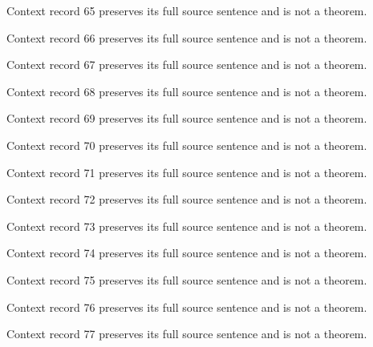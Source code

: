 \documentclass{article}
\begin{document}
\begin{remark}\label{train:context:65}Context record 65 preserves its full source sentence and is not a theorem.\end{remark}
\begin{remark}\label{train:context:66}Context record 66 preserves its full source sentence and is not a theorem.\end{remark}
\begin{remark}\label{train:context:67}Context record 67 preserves its full source sentence and is not a theorem.\end{remark}
\begin{remark}\label{train:context:68}Context record 68 preserves its full source sentence and is not a theorem.\end{remark}
\begin{remark}\label{train:context:69}Context record 69 preserves its full source sentence and is not a theorem.\end{remark}
\begin{remark}\label{train:context:70}Context record 70 preserves its full source sentence and is not a theorem.\end{remark}
\begin{remark}\label{train:context:71}Context record 71 preserves its full source sentence and is not a theorem.\end{remark}
\begin{remark}\label{train:context:72}Context record 72 preserves its full source sentence and is not a theorem.\end{remark}
\begin{remark}\label{train:context:73}Context record 73 preserves its full source sentence and is not a theorem.\end{remark}
\begin{remark}\label{train:context:74}Context record 74 preserves its full source sentence and is not a theorem.\end{remark}
\begin{remark}\label{train:context:75}Context record 75 preserves its full source sentence and is not a theorem.\end{remark}
\begin{remark}\label{train:context:76}Context record 76 preserves its full source sentence and is not a theorem.\end{remark}
\begin{remark}\label{train:context:77}Context record 77 preserves its full source sentence and is not a theorem.\end{remark}
\end{document}
